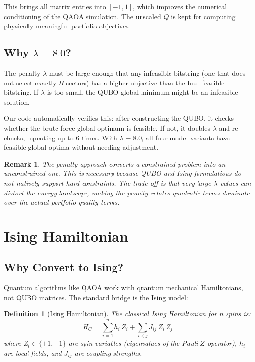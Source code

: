\documentclass[12pt, a4paper]{article}
\newtheorem{definition}{Definition}[section]
\newtheorem{remark}{Remark}[section]
\begin{document}
This brings all matrix entries into $[-1, 1]$, which improves the numerical
conditioning of the QAOA simulation. The unscaled $Q$ is kept for computing
physically meaningful portfolio objectives.

\subsection{Why $\lambda = 8.0$?}

The penalty $\lambda$ must be large enough that any infeasible bitstring
(one that does not select exactly $B$ sectors) has a higher objective than
the best feasible bitstring. If $\lambda$ is too small, the QUBO global
minimum might be an infeasible solution.

Our code automatically verifies this: after constructing the QUBO, it checks
whether the brute-force global optimum is feasible. If not, it doubles $\lambda$
and re-checks, repeating up to 6 times. With $\lambda = 8.0$, all four model
variants have feasible global optima without needing adjustment.

\begin{remark}
The penalty approach converts a \textit{constrained} problem into an
\textit{unconstrained} one. This is necessary because QUBO and Ising
formulations do not natively support hard constraints. The trade-off is that
very large $\lambda$ values can distort the energy landscape, making the
penalty-related quadratic terms dominate over the actual portfolio quality terms.
\end{remark}


\section{Ising Hamiltonian}

\subsection{Why Convert to Ising?}

Quantum algorithms like QAOA work with quantum mechanical Hamiltonians, not
QUBO matrices. The standard bridge is the Ising model:

\begin{definition}[Ising Hamiltonian]
The classical Ising Hamiltonian for $n$ spins is:
\[
H_C = \sum_{i=1}^{n} h_i\, Z_i + \sum_{i < j} J_{ij}\, Z_i\, Z_j
\]
where $Z_i \in \{+1, -1\}$ are spin variables (eigenvalues of the Pauli-$Z$ operator),
$h_i$ are local fields, and $J_{ij}$ are coupling strengths.
\end{definition}
\end{document}
